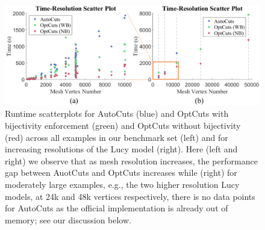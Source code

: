 \begin{figure}[t]
\centering
\includegraphics[width=\linewidth]{fig/time_res_compAutoCuts.png}
\vspace{-0.5cm}
\caption{Runtime scatterplots for AutoCuts (blue) and OptCuts with bijectivity enforcement (green) and OptCuts without bijectivity (red) across all examples in our benchmark set (left) and for increasing resolutions of the Lucy model (right). Here (left and right) we observe that as mesh resolution increases, the performance gap between AuotCuts and OptCuts increases while (right) for moderately large examples, e.g., the two higher resolution Lucy models, at 24k and 48k vertices respectively, there is no data points for AutoCuts as the official implementation is already out of memory; see our discussion below.
}
\label{fig:time_res_compAutoCuts}
\end{figure}



